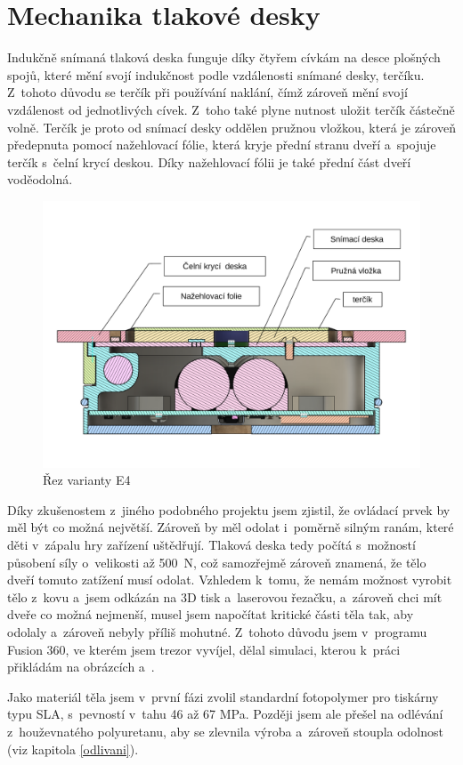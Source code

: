 \section{Mechanika tlakové desky}
\label{E4-mech_tlakovky}

Indukčně snímaná tlaková deska funguje díky čtyřem cívkám na desce ploš\-ných spojů, které mění svojí indukčnost podle vzdálenosti snímané desky, terčíku.
Z~tohoto důvodu se terčík při používání naklání, čímž zároveň mění svojí vzdálenost od jednotlivých cívek. Z~toho také plyne nutnost uložit terčík
částečně volně. Terčík je proto od snímací desky oddělen pružnou vložkou, která je zároveň předepnuta pomocí nažehlovací fólie, která kryje přední 
stranu dveří a~spojuje terčík s~čelní krycí deskou. Díky nažehlovací fólii je také přední část dveří voděodolná.

\begin{figure}[h]
    \centering
    \includegraphics[width=\textwidth]{kapitoly/obrazky/E4/machanika_tlakove_desky/rez_po_ose.pdf}
    \caption{Řez varianty E4}
    \label{fig:E4-rez}
\end{figure}

Díky zkušenostem z~jiného podobného projektu jsem zjistil, že ovládací prvek by měl být co možná největší. 
Zároveň by měl odolat i~poměrně silným ranám, které děti v~zápalu hry zařízení uštědřují.
Tlaková deska tedy počítá s~možností působení síly o~velikosti až 500~N, což samozřejmě zároveň znamená, že tělo dveří tomuto zatížení musí odolat.
Vzhledem k~tomu, že nemám možnost vyrobit tělo z~kovu a~jsem odkázán na 3D tisk a~laserovou řezačku, a~zároveň chci mít dveře co možná nejmenší,
musel jsem napočítat kritické části těla tak, aby odolaly a~zároveň nebyly příliš mohutné. Z~tohoto důvodu jsem v~programu Fusion 360, ve kterém jsem trezor vyvíjel,
dělal simulaci, kterou k~práci přikládám na obrázcích  a~.

Jako materiál těla jsem v~první fázi zvolil standardní fotopolymer pro tiskárny typu SLA, s~pevností v~tahu 46 až 67 MPa.
Později jsem ale přešel na odlévání z~houževnatého polyuretanu, aby se zlevnila výroba a~zároveň stoupla odolnost (viz kapitola \ref{odlivani}).